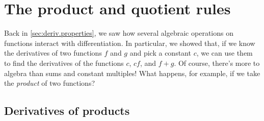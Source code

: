 \documentclass[../book/calcnotes.tex]{subfiles}
\begin{document}
\section{The product  and quotient rules}
\label{sec:deriv.prodquot}

Back in \cref{sec:deriv.properties}, we saw how several algebraic operations on functions interact with differentiation.
In particular, we showed that, if we know the derivatives of two functions $f$ and $g$ and pick a constant $c$, we can use them to find the derivatives of the functions $c$, $cf$, and $f+g$.
Of course, there's more to algebra than sums and constant multiples!
What happens, for example, if we take the \emph{product} of two functions?


\subsection{Derivatives of products}
\label{sec:productrule}
\end{document}
